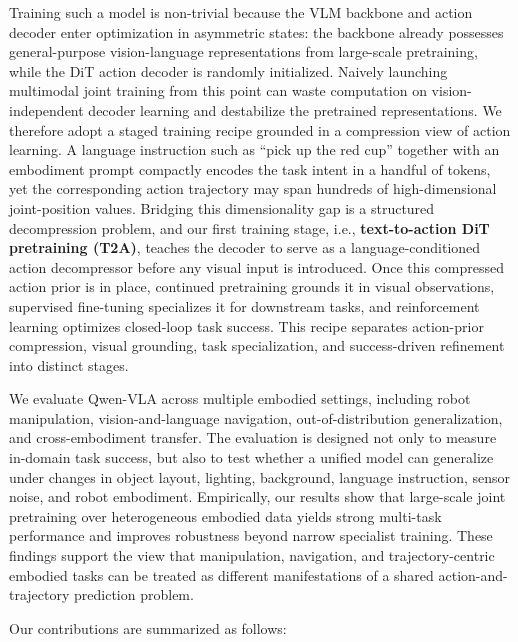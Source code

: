 \documentclass{article}
\begin{document}
 
Training such a model is non-trivial because the VLM backbone and action decoder enter optimization in asymmetric states: the backbone already possesses general-purpose vision-language representations from large-scale pretraining, while the DiT action decoder is randomly initialized. Naively launching multimodal joint training from this point can waste computation on vision-independent decoder learning and destabilize the pretrained representations. We therefore adopt a staged training recipe grounded in a compression view of action learning. A language instruction such as ``pick up the red cup'' together with an embodiment prompt compactly encodes the task intent in a handful of tokens, yet the corresponding action trajectory may span hundreds of high-dimensional joint-position values. Bridging this dimensionality gap is a structured decompression problem, and our first training stage, i.e., \textbf{text-to-action DiT pretraining (T2A)}, teaches the decoder to serve as a language-conditioned action decompressor before any visual input is introduced. Once this compressed action prior is in place, continued pretraining grounds it in visual observations, supervised fine-tuning specializes it for downstream tasks, and reinforcement learning optimizes closed-loop task success. This recipe separates action-prior compression, visual grounding, task specialization, and success-driven refinement into distinct stages.



We evaluate Qwen-VLA across multiple embodied settings, including robot manipulation, vision-and-language navigation, out-of-distribution generalization, and cross-embodiment transfer. The evaluation is designed not only to measure in-domain task success, but also to test whether a unified model can generalize under changes in object layout, lighting, background, language instruction, sensor noise, and robot embodiment. Empirically, our results show that large-scale joint pretraining over heterogeneous embodied data yields strong multi-task performance and improves robustness beyond narrow specialist training. These findings support the view that manipulation, navigation, and trajectory-centric embodied tasks can be treated as different manifestations of a shared action-and-trajectory prediction problem.

Our contributions are summarized as follows:
\end{document}
